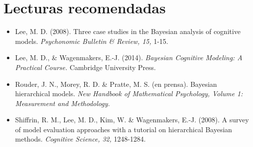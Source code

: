 \documentclass{article}
\begin{document}
\section*{Lecturas recomendadas}
	\begin{itemize}
	
	\item[]{Lee, M. D. (2008). Three case studies in the Bayesian analysis of cognitive models. \emph{Psychonomic Bulletin \& Review, 15,} 1-15.}

	\item[]{Lee, M. D., \& Wagenmakers, E.-J. (2014). \emph{Bayesian Cognitive Modeling: A Practical Course.} Cambridge University Press.}
	
    \item[]{Rouder, J. N., Morey, R. D. \& Pratte, M. S. (en prensa). Bayesian hierarchical models. \emph{New Handbook of Mathematical Psychology, Volume 1: Measurement and Methodology.}}
    
     \item[]{Shiffrin, R. M., Lee, M. D., Kim, W. \& Wagenmakers, E.-J. (2008). A survey of model evaluation approaches with a tutorial on hierarchical Bayesian methods. \emph{Cognitive Science, 32,} 1248-1284.}
      
    \end{itemize}


    
\end{document}
